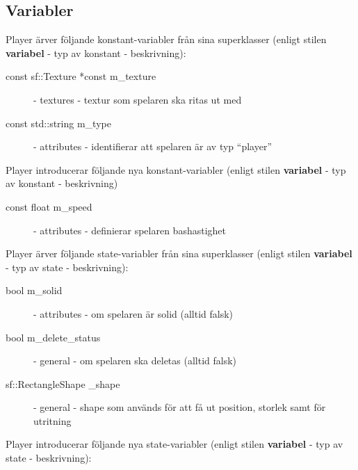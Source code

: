 \documentclass{TDP003mall}
\begin{document}
\subsection{Variabler}
Player ärver följande konstant-variabler från sina superklasser (enligt stilen \textbf{variabel} - typ av konstant - beskrivning):
\begin{description}
\item[const sf::Texture *const m\_texture] - textures - textur som spelaren ska ritas ut med
\item[const std::string m\_type] - attributes - identifierar att spelaren är av typ ``player''
\end{description}
Player introducerar följande nya konstant-variabler (enligt stilen \textbf{variabel} - typ av konstant - beskrivning)
\begin{description}
\item[const float m\_speed] - attributes - definierar spelaren bashastighet
\end{description}
Player ärver följande state-variabler från sina superklasser (enligt stilen \textbf{variabel} - typ av state - beskrivning):
\begin{description}
\item[bool m\_solid] - attributes - om spelaren är solid (alltid falsk)
\item[bool m\_delete\_status] - general - om spelaren ska deletas (alltid falsk)
\item[sf::RectangleShape \_shape] - general - shape som används för att få ut position, storlek samt för utritning
\end{description}
Player introducerar följande nya state-variabler (enligt stilen \textbf{variabel} - typ av state - beskrivning):
\end{document}
